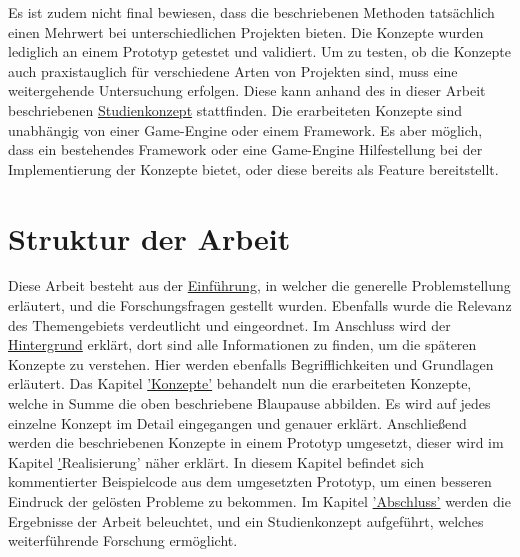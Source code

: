 Es ist zudem nicht final bewiesen, dass die beschriebenen Methoden tatsächlich einen Mehrwert bei unterschiedlichen Projekten bieten. Die Konzepte wurden lediglich an einem Prototyp getestet und validiert. Um zu testen, ob die Konzepte auch praxistauglich für verschiedene Arten von Projekten sind, muss eine weitergehende Untersuchung erfolgen. Diese kann anhand des in dieser Arbeit beschriebenen \hyperref[studienkonzept]{Studienkonzept} stattfinden. Die erarbeiteten Konzepte sind unabhängig von einer Game-Engine oder einem Framework. Es aber möglich, dass ein bestehendes Framework oder eine Game-Engine Hilfestellung bei der Implementierung der Konzepte bietet, oder diese bereits als Feature bereitstellt.

\section{Struktur der Arbeit}

Diese Arbeit besteht aus der \hyperref[sec:einfuehrung]{Einführung}, in welcher die generelle Problemstellung erläutert, und die Forschungsfragen gestellt wurden. Ebenfalls wurde die Relevanz des Themengebiets verdeutlicht und eingeordnet. Im Anschluss wird der \hyperref[sec:hintergrund]{Hintergrund} erklärt, dort sind alle Informationen zu finden, um die späteren Konzepte zu verstehen. Hier werden ebenfalls Begrifflichkeiten und Grundlagen erläutert. Das Kapitel \hyperref[sec:konzepte]{'Konzepte'} behandelt nun die erarbeiteten Konzepte, welche in Summe die oben beschriebene Blaupause abbilden. Es wird auf jedes einzelne Konzept im Detail eingegangen und genauer erklärt. Anschließend werden die beschriebenen Konzepte in einem Prototyp umgesetzt, dieser wird im Kapitel \hyperref[sec:realisierung]'{Realisierung'} näher erklärt. In diesem Kapitel befindet sich kommentierter Beispielcode aus dem umgesetzten Prototyp, um einen besseren Eindruck der gelösten Probleme zu bekommen. Im Kapitel \hyperref[sec:zusammenfassung]{'Abschluss'} werden die Ergebnisse der Arbeit beleuchtet, und ein Studienkonzept aufgeführt, welches weiterführende Forschung ermöglicht.
